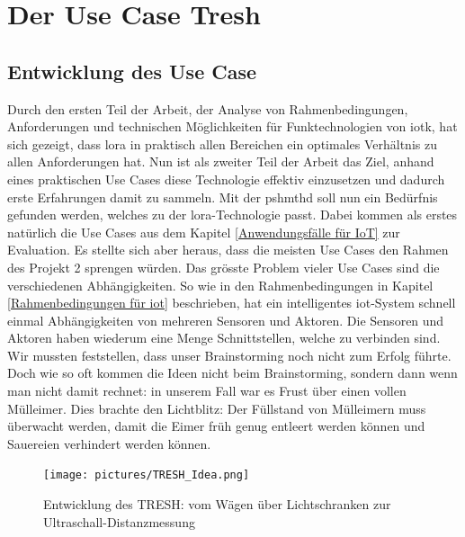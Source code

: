 \chapter{Der Use Case Tresh}

\section{Entwicklung des Use Case}\label{chapter:devOfUseCase}
Durch den ersten Teil der Arbeit, der Analyse von Rahmenbedingungen, Anforderungen und technischen Möglichkeiten für Funktechnologien von \gls{iotk}, hat sich gezeigt, dass \gls{lora} in praktisch allen Bereichen ein optimales Verhältnis zu allen Anforderungen hat. Nun ist als zweiter Teil der Arbeit das Ziel, anhand eines praktischen Use Cases diese Technologie effektiv einzusetzen und dadurch erste Erfahrungen damit zu sammeln. Mit der \gls{pshmthd} soll nun ein Bedürfnis gefunden werden, welches zu der \gls{lora}-Technologie passt. Dabei kommen als erstes natürlich die Use Cases aus dem Kapitel \ref{Anwendungsfälle für IoT} zur Evaluation. Es stellte sich aber heraus, dass die meisten Use Cases den Rahmen des Projekt 2 sprengen würden. Das grösste Problem vieler Use Cases sind die verschiedenen Abhängigkeiten. So wie in den Rahmenbedingungen in Kapitel \ref{Rahmenbedingungen für iot} beschrieben, hat ein intelligentes \gls{iot}-System schnell einmal Abhängigkeiten von mehreren Sensoren und Aktoren. Die Sensoren und Aktoren haben wiederum eine Menge Schnittstellen, welche zu verbinden sind. Wir mussten feststellen, dass unser Brainstorming noch nicht zum Erfolg führte. Doch wie so oft kommen die Ideen nicht beim Brainstorming, sondern dann wenn man nicht damit rechnet: in unserem Fall war es Frust über einen vollen Mülleimer. Dies brachte den Lichtblitz: Der Füllstand von Mülleimern muss überwacht werden, damit die Eimer früh genug entleert werden können und Sauereien verhindert werden können.

\begin{figure}[H]
     \centering
        \texttt{[image: pictures/TRESH\_Idea.png]}
    \caption{Entwicklung des TRESH: vom Wägen über Lichtschranken zur Ultraschall-Distanzmessung}
    \label{fig:TRESH Idee}
\end{figure}

